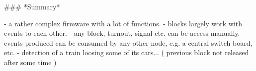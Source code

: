 ### *Summary*

- a rather complex firmware with a lot of functions.
- blocks largely work with events to each other.
- any block, turnout, signal etc. can be access manually.
- events produced can be consumed by any other node, e.g. a central switch board, etc.
- detection of a train loosing some of its cars... ( previous block not released after some time )
